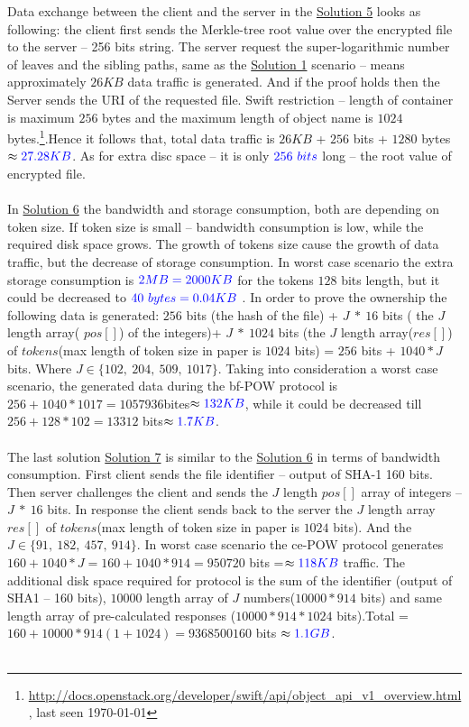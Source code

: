 \documentclass[12pt]{article}
\begin{document}
Data exchange between the client and the server in the \hyperref[sub:Soltuion5]{Solution 5} looks as  following: the client first sends the Merkle-tree root value over the encrypted file to the server  -- 256 bits string. The server request the super-logarithmic number of leaves and the sibling paths, same as the \hyperref[sub:Soltuion1]{Solution 1} scenario -- means  approximately $26KB$ data traffic is generated. And if the proof holds then the Server sends the URI of the requested file. Swift restriction -- length of container is maximum $256$ bytes and the maximum length of object name is $1024$ bytes.\footnote{\url{http://docs.openstack.org/developer/swift/api/object_api_v1_overview.html}, last seen \today}.Hence it follows that, total data traffic is $26KB$ + $256$ bits + $1280$ bytes $\approx \color{blue} 27.28KB$. As for extra disc space -- it is only $\color{blue}256\ bits$  long -- the root value of encrypted file.\\\\
In \hyperref[sub:Soltuion6]{Solution 6} the bandwidth  and storage consumption, both are depending on token size. If token size is small -- bandwidth consumption is low, while the required disk space grows. The growth of tokens size cause the growth of data traffic, but the  decrease  of storage consumption. In worst case scenario the extra storage consumption is $\color{blue}2MB=2000KB$ for the tokens $128$ bits length, but it could be decreased to $\color{blue}40\ bytes=0.04KB$ . In order to prove the ownership the following data is generated: $256$ bits (the hash of the file)  +  $J\ *\ 16 $ bits ( the $J$ length array( $pos []$) of the integers)+ $J\ *\ 1024$ bits (the $J$ length array($res[]$) of $tokens$(max length of token size in paper is $1024$ bits) = $256$ bits + $1040*J$ bits. Where $J \in \{102,\ 204,\ 509,\ 1017\}$. Taking into consideration a worst case scenario, the generated data during the bf-POW protocol is $256 + 1040*1017 = 1057936$bites$\approx \color{blue}132KB$, while it could be decreased till $256+128*102=13312$ bits$\approx\color{blue}1.7KB$.\\\\
The last solution \hyperref[sub:Soltuion7]{Solution 7} is similar to the \hyperref[sub:Soltuion6]{Solution 6} in terms of bandwidth consumption. First client sends the file identifier -- output of SHA-1 160 bits. Then server challenges the client and sends the $J$ length $pos[]$ array of integers -- $J\ *\ 16$ bits. In response the client  sends back to the server the $J$ length array $res[]$ of $tokens$(max length of token size in paper is $1024$ bits). And the  $J \in \{91,\ 182,\ 457,\ 914\}$. In worst case scenario the ce-POW protocol generates $160+1040*J=160+1040*914=950720$ bits =$\approx \color{blue} 118 KB$ traffic. The additional disk space required for protocol is the sum of the identifier (output of SHA1 -- 160 bits), $10 000$ length array of $J$ numbers($10000*914$ bits) and same length array of pre-calculated responses ($10000*914*1024$ bits).Total = $160 + 10000*914(1+1024)=9368500160$ bits $\approx \color{blue} 1.1 GB $.\\\\
\end{document}
